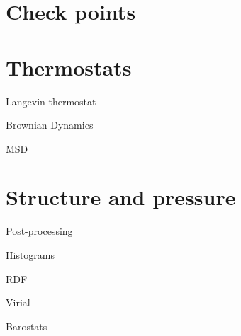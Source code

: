 \section{Check points}

\section{Thermostats}

Langevin thermostat

Brownian Dynamics

MSD

\section{Structure and pressure}

Post-processing

Histograms

RDF

Virial

Barostats

